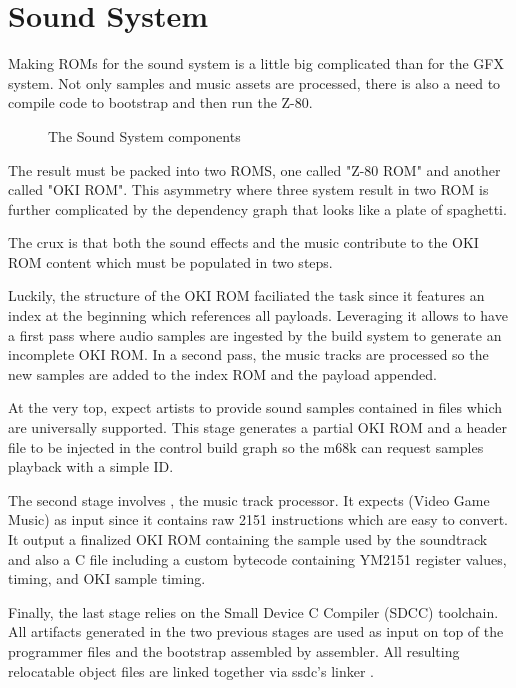 \chapter{Sound System}
Making ROMs for the sound system is a little big complicated than for the GFX system. Not only samples and music assets are processed, there is also a need to compile code to bootstrap and then run the Z-80. 

\begin{figure}[H]
\caption*{The Sound System components}
\end{figure}

The result must be packed into two ROMS, one called "Z-80 ROM" and another called "OKI ROM". This asymmetry where three system result in two ROM is further complicated by the dependency graph that looks like a plate of spaghetti. 

The crux is that both the sound effects and the music contribute to the OKI ROM content which must be populated in two steps.




Luckily, the structure of the OKI ROM faciliated the task since it features an index at the beginning which references all payloads. Leveraging it allows to have a first pass where audio samples are ingested by the build system to generate an incomplete OKI ROM. In a second pass, the music tracks are processed so the new samples are added to the index ROM and the payload appended.

At the very top,  expect artists to provide sound samples contained in  files which are universally supported. This stage generates a partial OKI ROM and a  header file to be injected in the control build graph so the m68k can request samples playback with a simple ID.

The second stage involves , the music track processor. It expects  (Video Game Music) as input since it contains raw 2151 instructions which are easy to convert. It output a finalized OKI ROM containing the sample used by the soundtrack and also a  C file including a custom bytecode containing YM2151 register values, timing, and OKI sample timing.

Finally, the last stage relies on the Small Device C Compiler (SDCC) toolchain. All artifacts generated in the two previous stages are used as input on top of the programmer  files and the bootstrap  assembled by  assembler. All resulting relocatable object files  are linked together via ssdc's linker . 



